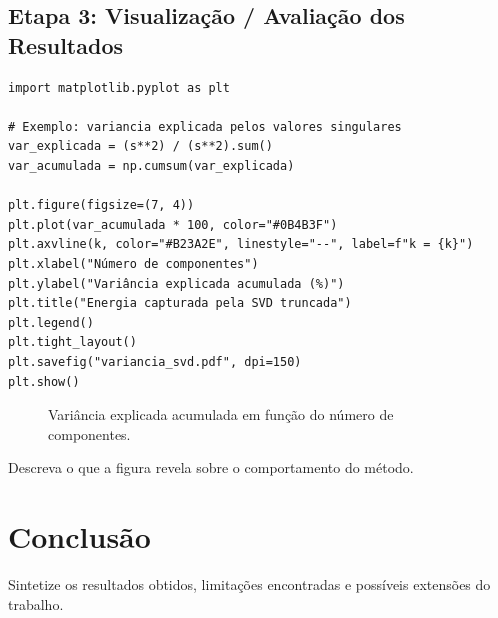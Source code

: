 \documentclass[12pt, a4paper]{article}
\begin{document}

\subsection{Etapa 3: Visualização / Avaliação dos Resultados}

\begin{lstlisting}[caption={Visualização dos resultados}, label={lst:viz}]
import matplotlib.pyplot as plt

# Exemplo: variancia explicada pelos valores singulares
var_explicada = (s**2) / (s**2).sum()
var_acumulada = np.cumsum(var_explicada)

plt.figure(figsize=(7, 4))
plt.plot(var_acumulada * 100, color="#0B4B3F")
plt.axvline(k, color="#B23A2E", linestyle="--", label=f"k = {k}")
plt.xlabel("Número de componentes")
plt.ylabel("Variância explicada acumulada (%)")
plt.title("Energia capturada pela SVD truncada")
plt.legend()
plt.tight_layout()
plt.savefig("variancia_svd.pdf", dpi=150)
plt.show()
\end{lstlisting}

\begin{figure}[H]
  \centering
  \caption{Variância explicada acumulada em função do número de componentes.}
  \label{fig:variancia}
\end{figure}

Descreva o que a figura revela sobre o comportamento do método.

\newpage

\section{Conclusão}
\label{sec:conclusao}

Sintetize os resultados obtidos, limitações encontradas e possíveis
extensões do trabalho.

\newpage

\printbibliography[heading=bibintoc, title={Referências}]
\end{document}
